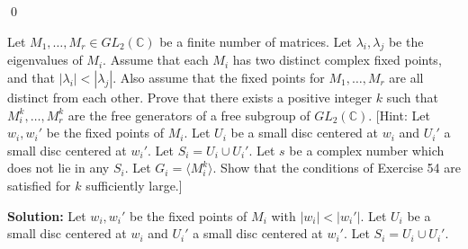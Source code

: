 \qed
\begin{problembox}
Let $M_1, \ldots, M_r \in GL_2(\mathbb{C})$ be a finite number of matrices. Let $\lambda_i, \lambda_j$ be the eigenvalues of $M_i$. Assume that each $M_i$ has two distinct complex fixed points, and that $|\lambda_i| < |\lambda_j|$. Also assume that the fixed points for $M_1, \ldots, M_r$ are all distinct from each other. Prove that there exists a positive integer $k$ such that $M_i^k, \ldots, M_r^k$ are the free generators of a free subgroup of $GL_2(\mathbb{C})$. [Hint: Let $w_i, w_i'$ be the fixed points of $M_i$. Let $U_i$ be a small disc centered at $w_i$ and $U_i'$ a small disc centered at $w_i'$. Let $S_i = U_i \cup U_i'$. Let $s$ be a complex number which does not lie in any $S_i$. Let $G_i = \langle M_i^k \rangle$. Show that the conditions of Exercise 54 are satisfied for $k$ sufficiently large.]

\end{problembox}

\noindent\textbf{Solution:} Let $w_i, w_i'$ be the fixed points of $M_i$ with $|w_i| < |w_i'|$. Let $U_i$ be a small disc centered at $w_i$ and $U_i'$ a small disc centered at $w_i'$. Let $S_i = U_i \cup U_i'$.

